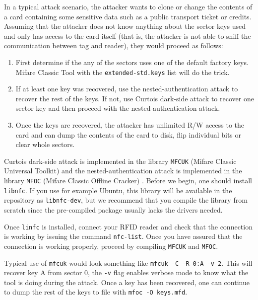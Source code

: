 \documentclass[10pt,twocolumn]{article}
\begin{document}
In a typical attack scenario, the attacker wants to clone or change the contents of a card containing some sensitive data such as a public transport ticket or credits. Assuming that the attacker does not know anything about the sector keys used and only has access to the card itself (that is, the attacker is not able to sniff the communication between tag and reader), they would proceed as follows:
\begin{enumerate}
    \item First determine if the any of the sectors uses one of the default factory keys. Mifare Classic Tool with the \verb!extended-std.keys! list will do the trick.
    \item If at least one key was recovered, use the nested-authentication attack to recover the rest of the keys. If not, use Curtois dark-side attack to recover one sector key and then proceed with the nested-authentication attack.
    \item Once the keys are recovered, the attacker has unlimited R/W access to the card and can dump the contents of the card to disk, flip individual bits or clear whole sectors.
\end{enumerate}

Curtois dark-side attack is implemented in the library \verb!MFCUK! (Mifare Classic Universal Toolkit) and the nested-authentication attack is implemented in the library \verb!MFOC! (Mifare Classic Offline Cracker) \cite{gupta}. Before we begin, one should install \verb!libnfc!. If you use for example Ubuntu, this library will be available in the repository as \verb!libnfc-dev!, but we recommend that you compile the library from scratch since the pre-compiled package usually lacks the drivers needed.



Once \verb!linfc! is installed, connect your RFID reader and check that the connection is working by issuing the command \verb!nfc-list!. Once you have assured that the connection is working properly, proceed by compiling \verb!MFCUK! and \verb!MFOC!.



Typical use of \verb!mfcuk! would look something like \verb!mfcuk -C -R 0:A -v 2!. This will recover key A from sector 0, the \verb!-v! flag enables verbose mode to know what the tool is doing during the attack. Once a key has been recovered, one can continue to dump the rest of the keys to file with \verb!mfoc -O keys.mfd!. 
\end{document}
